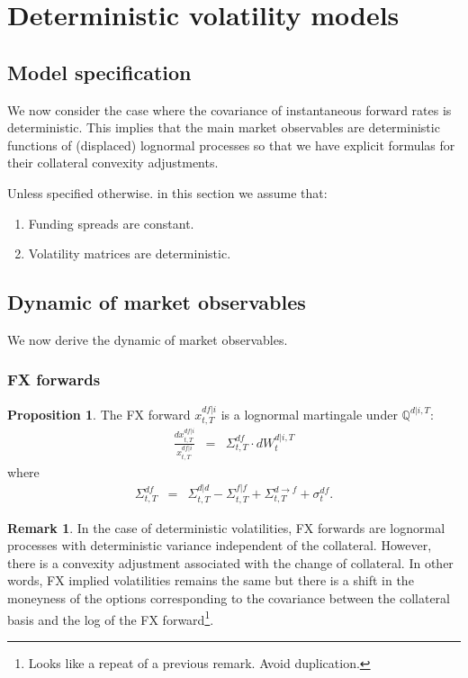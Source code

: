 \documentclass[11pt,english]{amsart}
\newcommand{\QQ}{\mathbb{Q}}
\theoremstyle{definition}
\newtheorem{prop}{Proposition}
\newtheorem{rema}{Remark}
\begin{document}
\newpage%
\section{Deterministic volatility models}


\subsection{Model specification}%

We now consider the case where the covariance of instantaneous forward rates is deterministic. This implies that the main market observables are deterministic functions of (displaced) lognormal processes so that we have explicit formulas for their collateral convexity adjustments.

Unless specified otherwise. in this section we assume that:
\begin{enumerate}
\item Funding spreads are constant.
\item Volatility matrices are deterministic.
\end{enumerate}


\subsection{Dynamic of market observables}
We now derive the dynamic of market observables. %


\subsubsection{FX forwards}

\begin{prop}
The FX forward $x^{df|i}_{t,T}$ is a lognormal martingale under $\QQ^{d|i,T}$:  
\begin{eqnarray}
  \frac{dx^{df|i}_{t,T}}{x^{df|i}_{t,T}} &=& \Sigma^{df}_{t,T} \cdot dW^{d|i,T}_{t} 
\end{eqnarray}
where 
\begin{eqnarray}
  \Sigma^{df}_{t,T} &=& \Sigma^{d|d}_{t,T} - \Sigma^{f|f}_{t,T} +\Sigma^{d\to f}_{t,T}  + \sigma^{df}_t  .
\end{eqnarray}
\end{prop}

\begin{rema}
In the case of deterministic volatilities, FX forwards are lognormal processes with deterministic variance independent of the collateral. However, there is a convexity adjustment associated with the change of collateral. In other words, FX implied volatilities remains the same but there is a shift in the moneyness of the options corresponding to the covariance between the collateral basis and the log of the FX forward\footnote{Looks like a repeat of a previous remark. Avoid duplication.}.
\end{rema}
\end{document}
